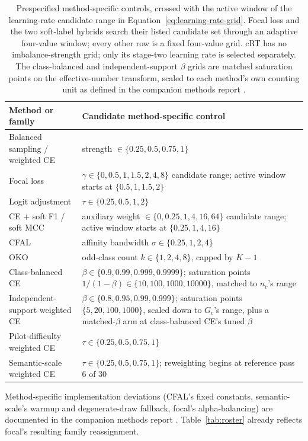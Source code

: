 \documentclass[11pt]{article}
\begin{document}
\begin{table}[ht]
  \centering
  \footnotesize
  \begin{tabularx}{\linewidth}{@{}lX@{}}
    \toprule
    Method or family & Candidate method-specific control \\
    \midrule
    Balanced sampling / weighted CE & strength $\in\{0.25,0.5,0.75,1\}$ \\
    Focal loss & $\gamma\in\{0,0.5,1,1.5,2,4,8\}$ candidate range; active window starts at $\{0.5,1,1.5,2\}$ \\
    Logit adjustment & $\tau\in\{0.25,0.5,1,2\}$ \\
    CE + soft F1 / soft MCC & auxiliary weight $\in\{0,0.25,1,4,16,64\}$ candidate range; active window starts at $\{0.25,1,4,16\}$ \\
    CFAL & affinity bandwidth $\sigma\in\{0.25,1,2,4\}$ \\
    OKO & odd-class count $k\in\{1,2,4,8\}$, capped by $K-1$ \\
    Class-balanced CE & $\beta\in\{0.9,0.99,0.999,0.9999\}$; saturation points $1/(1-\beta)\in\{10,100,1000,10000\}$, matched to $n_c$'s range \\
    Independent-support weighted CE & $\beta\in\{0.8,0.95,0.99,0.999\}$; saturation points $\{5,20,100,1000\}$, scaled down to $G_c$'s range, plus a matched-$\beta$ arm at class-balanced CE's tuned $\beta$ \\
    Pilot-difficulty weighted CE & $\tau\in\{0.25,0.5,0.75,1\}$ \\
    Semantic-scale weighted CE & $\tau\in\{0.25,0.5,0.75,1\}$; reweighting begins at reference pass 6 of 30 \\
    \bottomrule
  \end{tabularx}
  \caption{Prespecified method-specific controls, crossed with the active window of the learning-rate candidate range in Equation~\eqref{eq:learning-rate-grid}. Focal loss and the two soft-label hybrids search their listed candidate set through an adaptive four-value window; every other row is a fixed four-value grid. cRT has no imbalance-strength grid; only its stage-two learning rate is selected separately. The class-balanced and independent-support $\beta$ grids are matched saturation points on the effective-number transform, scaled to each method's own counting unit as defined in the companion methods report \citep{queisler2026imbalanceMethods}.}
  \label{tab:controls}
\end{table}

\noindent Method-specific implementation deviations (CFAL's fixed constants, semantic-scale's warmup and degenerate-draw fallback, focal's alpha-balancing) are documented in the companion methods report \citep{queisler2026imbalanceMethods}. Table~\ref{tab:roster} already reflects focal's resulting family reassignment.
\end{document}
